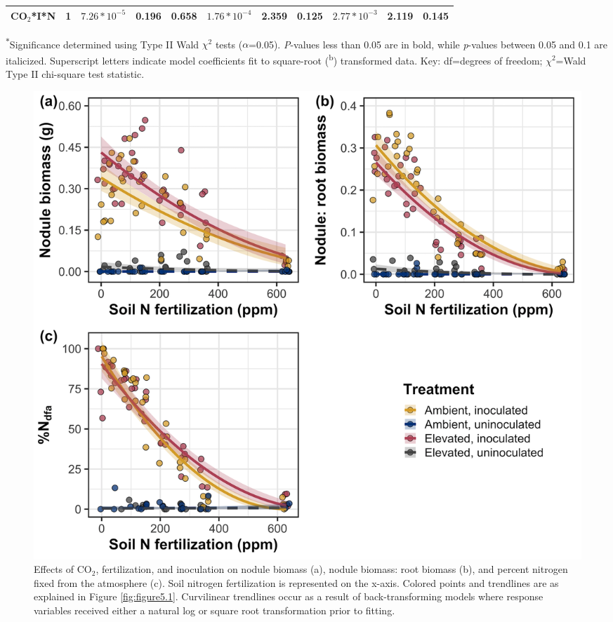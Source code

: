\begin{landscape}
\begin{table}
{\begin{tabular}{p{3.5cm}p{0.5cm}p{1.75cm}p{1.5cm}p{1.5cm}p{1.75cm}p{1.5cm}p{1.5cm}p{1.75cm}p{1.5cm}p{1.5cm}}
            CO$_2$*I*N & \multicolumn{1}{r}{1}
            & \multicolumn{1}{r}{$7.26*10^{-5}$}      & \multicolumn{1}{r}{0.196}         & \multicolumn{1}{r}{0.658}
            & \multicolumn{1}{r}{$1.76*10^{-4}$}      & \multicolumn{1}{r}{2.359}         & \multicolumn{1}{r}{0.125}
            & \multicolumn{1}{r}{$2.77*10^{-3}$}      & \multicolumn{1}{r}{2.119}         & \multicolumn{1}{r}{0.145} 
            \\
            \hline
    \end{tabular}}
    \label{tab:table5.5}
    \end{table}
\begin{singlespace}
    \noindent \textsuperscript{$*$}Significance determined using Type II Wald $\chi^2$ tests ($\alpha$=0.05). \textit{P}-values less than 0.05 are in bold, while \textit{p}-values between 0.05 and 0.1 are italicized. Superscript letters indicate model coefficients fit to square-root (\textsuperscript{b}) transformed data.  Key: df=degrees of freedom; $\chi^2$=Wald Type II chi-square test statistic.
\end{singlespace}
\end{landscape}
\clearpage

\newpage
\begin{figure}
    \centering
    \includegraphics[width=\columnwidth]{ch5_NxCO2xI/figs/NxCO2xI_fig5_nFix.jpg}
    \caption[Effects of CO$_2$, fertilization, and inoculation on nodule biomass, nodule biomass: root biomass, and percent nitrogen fixed from the atmosphere]{Effects of CO$_2$, fertilization, and inoculation on nodule biomass (a), nodule biomass: root biomass (b), and percent nitrogen fixed from the atmosphere (c). Soil nitrogen fertilization is represented on the x-axis. Colored points and trendlines are as explained in Figure \ref{fig:figure5.1}. Curvilinear trendlines occur as a result of back-transforming models where response variables received either a natural log or square root transformation prior to fitting.}
    \label{fig:figure5.5}
\end{figure}
\clearpage

